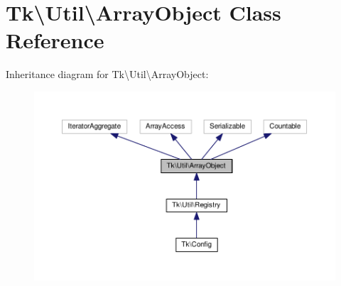 \hypertarget{classTk_1_1Util_1_1ArrayObject}{\section{Tk\textbackslash{}Util\textbackslash{}Array\+Object Class Reference}
\label{classTk_1_1Util_1_1ArrayObject}
}


Inheritance diagram for Tk\textbackslash{}Util\textbackslash{}Array\+Object\+:\nopagebreak
\begin{figure}[H]
\begin{center}
\leavevmode
\includegraphics[width=350pt]{classTk_1_1Util_1_1ArrayObject__inherit__graph}
\end{center}
\end{figure}
